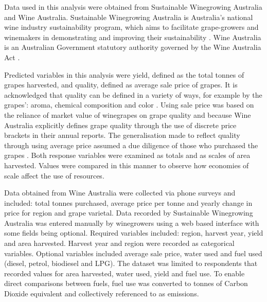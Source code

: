 \documentclass[review,12pt,authoryear]{elsarticle}
\begin{document}
\begin{linenumbers}
Data used in this analysis were obtained from Sustainable Winegrowing Australia and Wine Australia. Sustainable Winegrowing Australia is Australia's national wine industry sustainability program, which aims to facilitate grape-growers and winemakers in demonstrating and improving their sustainability \citep{swaSustainableWingrowingAustralia2022}. Wine Australia is an Australian Government statutory authority governed by the Wine Australia Act \citep{attorney-generalsdepartmentWineAustraliaCorporation2010}.
\par
Predicted variables in this analysis were yield, defined as the total tonnes of grapes harvested, and quality, defined as average sale price of grapes. It is acknowledged that quality can be defined in a variety of ways, for example by the grapes': aroma, chemical composition and color \citep{kasimatiPredictingGrapeSugar2022,mejeanperrotDecisionsupportSystemPredict2022,suarezAssessingWineGrape2021}. Using sale price was based on the reliance of market value of winegrapes on grape quality and because Wine Australia explicitly defines grape quality through the use of discrete price brackets in their annual reports. The generalisation made to reflect quality through using average price assumed a due diligence of those who purchased the grapes \citep{yeggeInfluenceSensoryNonsensory2001}. Both response variables were examined as totals and as scales of area harvested. Values were compared in this manner to observe how economies of scale affect the use of resources.
\par
Data obtained from Wine Australia were collected via phone surveys and included: total tonnes purchased, average price per tonne and yearly change in price for region and grape varietal. Data recorded by Sustainable Winegrowing Australia was entered manually by winegrowers using a web based interface with some fields being optional. Required variables included: region, harvest year, yield and area harvested. Harvest year and region were recorded as categorical variables. Optional variables included average sale price, water used and fuel used (diesel, petrol, biodiesel and LPG). The dataset was limited to respondents that recorded values for area harvested, water used, yield and fuel use. To enable direct comparisons between fuels, fuel use was converted to tonnes of Carbon Dioxide equivalent and collectively referenced to as emissions.
\par

\end{linenumbers}
\end{document}
